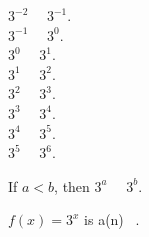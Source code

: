 \documentclass{ximera}
\author{Lee Wayand}
\begin{document}
\begin{example}


\begin{question}


$3^{-2}$ \, \wordChoice{\choice[correct]{<} \choice{>}} \, $3^{-1}$.  \\

$3^{-1}$ \, \wordChoice{\choice[correct]{<} \choice{>}} \, $3^{0}$.  \\

$3^{0}$ \, \wordChoice{\choice[correct]{<} \choice{>}} \, $3^{1}$.  \\

$3^{1}$ \, \wordChoice{\choice[correct]{<} \choice{>}} \, $3^{2}$.  \\

$3^{2}$ \, \wordChoice{\choice[correct]{<} \choice{>}} \, $3^{3}$.  \\

$3^{3}$ \, \wordChoice{\choice[correct]{<} \choice{>}} \, $3^{4}$.  \\

$3^{4}$ \, \wordChoice{\choice[correct]{<} \choice{>}} \, $3^{5}$.  \\

$3^{5}$ \, \wordChoice{\choice[correct]{<} \choice{>}} \, $3^{6}$.  \\


\end{question}




\begin{question}



If $a < b$, then $3^{a}$ \, \wordChoice{\choice[correct]{<} \choice{>}} \, $3^{b}$.  \\



\end{question}





\begin{question}



$f(x) = 3^{x}$  is a(n) \,  .  \\



\end{question}





















\end{example}
\end{document}

